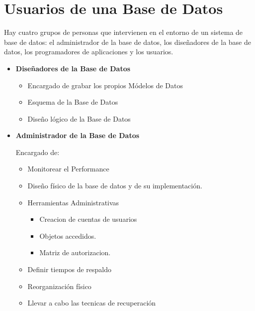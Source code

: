 \documentclass[12pt, fleqn]{report}                             %
\begin{document}
        \section{Usuarios de una Base de Datos}


            Hay cuatro grupos de personas que intervienen en el entorno de un sistema de base de datos:
            el administrador de la base de datos, los diseñadores de la base de datos, los programadores
            de aplicaciones y los usuarios.

            \begin{itemize}

                \item
                    \textbf{Diseñadores de la Base de Datos}

                    \begin{itemize}
                        \item Encargado de grabar los propios Módelos de Datos
                        \item Esquema de la Base de Datos
                        \item Diseño lógico de la Base de Datos
                    \end{itemize}


                \item
                    \textbf{Administrador de la Base de Datos}

                    Encargado de: 

                        \begin{itemize}
                            \item Monitorear el Performance
                            \item Diseño físico de la base de datos y de su implementación.
                            \item Herramientas Administrativas
                                \begin{itemize}
                                    \item Creacion de cuentas de usuarios
                                    \item Objetos accedidos.
                                    \item Matriz de autorizacion.
                                \end{itemize}
                            \item Definir tiempos de respaldo
                            \item Reorganización físico
                            \item Llevar a cabo las tecnicas de recuperación
                        \end{itemize}


\end{itemize}
\end{document}
